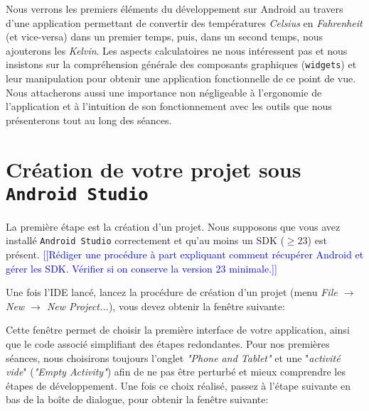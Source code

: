 \documentclass[a4paper,10pt]{article}
\begin{document}
Nous verrons les premiers éléments du développement sur Android au travers d'une application permettant de convertir des températures \textit{Celsius} en \textit{Fahrenheit} (et vice-versa) dans un premier temps, puis, dans un second temps, nous ajouterons les \textit{Kelvin}. Les aspects calculatoires ne nous intéressent pas et nous insistons sur la compréhension générale des composants graphiques (\texttt{widgets}) et leur manipulation pour obtenir une application fonctionnelle de ce point de vue. Nous attacherons aussi une importance non négligeable à l'ergonomie de l'application et à l'intuition de son fonctionnement avec les outils que nous présenterons tout au long des séances.


\section{Création de votre projet sous \texttt{Android Studio}}

La première étape est la création d'un projet. Nous supposons que vous avez installé \texttt{Android Studio} correctement et qu'au moins un SDK ($\geq 23$) est présent. \textcolor{blue}{[[Rédiger une procédure à part expliquant comment récupérer Android et gérer les SDK. Vérifier si on conserve la version 23 minimale.]]}

Une fois l'IDE lancé, lancez la procédure de création d'un projet (menu \textit{File $\rightarrow$ New $\rightarrow$ New Project...}), vous devez obtenir la fenêtre suivante: 

Cette fenêtre permet de choisir la première interface de votre application, ainsi que le code associé simplifiant des étapes redondantes. Pour nos premières séances, nous choisirons toujours l'onglet \textit{"Phone and Tablet"} et une "\textit{activité vide}" (\textit{"Empty Activity"}) afin de ne pas être perturbé et mieux comprendre les étapes de développement.
Une fois ce choix réalisé, passez à l'étape suivante en bas de la boîte de dialogue, pour obtenir la fenêtre suivante:

\begin{center}
\end{center}
\end{document}
